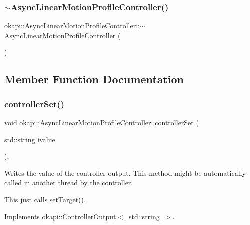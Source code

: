 \subsubsection{\texorpdfstring{$\sim$AsyncLinearMotionProfileController()}{~AsyncLinearMotionProfileController()}}
{\footnotesize\ttfamily okapi\+::\+Async\+Linear\+Motion\+Profile\+Controller\+::$\sim$\+Async\+Linear\+Motion\+Profile\+Controller (\begin{DoxyParamCaption}{ }\end{DoxyParamCaption})\hspace{0.3cm}{\ttfamily [override]}}



\subsection{Member Function Documentation}
\mbox{\label{classokapi_1_1AsyncLinearMotionProfileController_a45b62483002333a2d99deea8de2af43e}} 
\subsubsection{\texorpdfstring{controllerSet()}{controllerSet()}}
{\footnotesize\ttfamily void okapi\+::\+Async\+Linear\+Motion\+Profile\+Controller\+::controller\+Set (\begin{DoxyParamCaption}\item[{std\+::string}]{ivalue }\end{DoxyParamCaption})\hspace{0.3cm}{\ttfamily [override]}, {\ttfamily [virtual]}}

Writes the value of the controller output. This method might be automatically called in another thread by the controller.

This just calls {\ttfamily \mbox{\hyperlink{classokapi_1_1AsyncLinearMotionProfileController_a18e3ba77f08cb5dd93a9cba23d4c2a1e}{set\+Target()}}}. 

Implements \mbox{\hyperlink{classokapi_1_1ControllerOutput_a360c08f0c10b36f882d6d3100c2cad49}{okapi\+::\+Controller\+Output$<$ std\+::string $>$}}.

\mbox{\label{classokapi_1_1AsyncLinearMotionProfileController_a3b2473f949bab83f6837b8d448b198cb}} 
